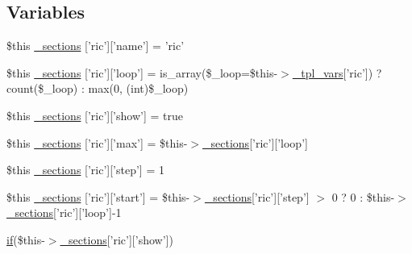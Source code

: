 \subsection*{\-Variables}
\begin{DoxyCompactItemize}
\item 
\$this \hyperlink{_06_06-39_05_06_06-392581648_05top__frame_8tpl_8php_a46a9ebbb2bb912bbc61a9b2b78ca590e}{\-\_\-sections} \mbox{[}'ric'\mbox{]}\mbox{[}'name'\mbox{]} = 'ric'
\item 
\$this \hyperlink{_06_06-39_05_06_06-392581648_05top__frame_8tpl_8php_a8e326e8a9e259c92585790796b2f0a7a}{\-\_\-sections} \mbox{[}'ric'\mbox{]}\mbox{[}'loop'\mbox{]} = is\-\_\-array(\$\-\_\-loop=\$this-\/$>$\hyperlink{_06_06127_05_06_0612781687_05pkgelementindex_8tpl_8php_a4a4846d8e68d455590131a05697f67a3}{\-\_\-tpl\-\_\-vars}\mbox{[}'ric'\mbox{]}) ? count(\$\-\_\-loop) \-: max(0, (int)\$\-\_\-loop)
\item 
\$this \hyperlink{_06_06-39_05_06_06-392581648_05top__frame_8tpl_8php_a32d7057d97f974f5303d503d40475c46}{\-\_\-sections} \mbox{[}'ric'\mbox{]}\mbox{[}'show'\mbox{]} = true
\item 
\$this \hyperlink{_06_06-39_05_06_06-392581648_05top__frame_8tpl_8php_a40d72b12d528a4b6e7977abc40c01991}{\-\_\-sections} \mbox{[}'ric'\mbox{]}\mbox{[}'max'\mbox{]} = \$this-\/$>$\hyperlink{_06_06127_05_06_0612781687_05pkgelementindex_8tpl_8php_a9e3d26b39edfe29c3f29b8035ef33828}{\-\_\-sections}\mbox{[}'ric'\mbox{]}\mbox{[}'loop'\mbox{]}
\item 
\$this \hyperlink{_06_06-39_05_06_06-392581648_05top__frame_8tpl_8php_ab86b2ebfccd40e96358aed7b0dada55c}{\-\_\-sections} \mbox{[}'ric'\mbox{]}\mbox{[}'step'\mbox{]} = 1
\item 
\$this \hyperlink{_06_06-39_05_06_06-392581648_05top__frame_8tpl_8php_aa9b5471fe92710d42c1000b8150ee1bb}{\-\_\-sections} \mbox{[}'ric'\mbox{]}\mbox{[}'start'\mbox{]} = \$this-\/$>$\hyperlink{_06_06127_05_06_0612781687_05pkgelementindex_8tpl_8php_a9e3d26b39edfe29c3f29b8035ef33828}{\-\_\-sections}\mbox{[}'ric'\mbox{]}\mbox{[}'step'\mbox{]} $>$ 0 ? 0 \-: \$this-\/$>$\hyperlink{_06_06127_05_06_0612781687_05pkgelementindex_8tpl_8php_a9e3d26b39edfe29c3f29b8035ef33828}{\-\_\-sections}\mbox{[}'ric'\mbox{]}\mbox{[}'loop'\mbox{]}-\/1
\item 
\hyperlink{_setup_8inc_8php_ad0184337b31d13763ec8751feff4aabe}{if}(\$this-\/$>$\hyperlink{_06_06127_05_06_0612781687_05pkgelementindex_8tpl_8php_a9e3d26b39edfe29c3f29b8035ef33828}{\-\_\-sections}\mbox{[}'ric'\mbox{]}\mbox{[}'show'\mbox{]}) \*

\end{DoxyCompactItemize}

